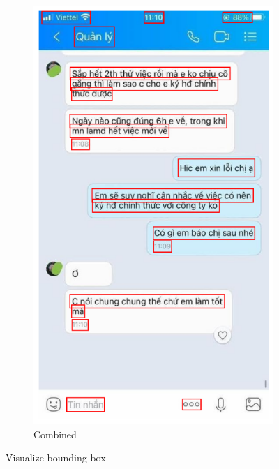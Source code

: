 \documentclass[11pt]{article}
\begin{document}
\begin{figure}[h!]
\begin{subfigure}{0.3\linewidth}
        \includegraphics[width=\linewidth]{__results___10_3.png}
        \caption{Combined}
    \end{subfigure}
    \caption{Visualize bounding box}
    \label{fig:visual}
\end{figure}

\vspace*{-3mm}
\end{document}
